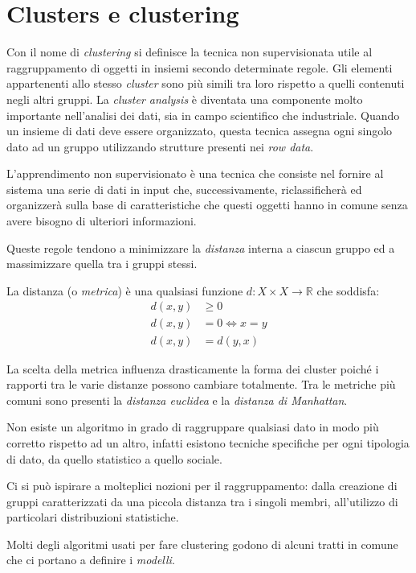 \chapter{Clusters e clustering}
	Con il nome di \emph{clustering} si definisce la tecnica non supervisionata utile al raggruppamento di oggetti in insiemi secondo determinate regole. Gli elementi appartenenti allo stesso \emph{cluster} sono più simili tra loro rispetto a quelli contenuti negli altri gruppi. La \emph{cluster analysis} è diventata una componente molto importante nell'analisi dei dati, sia in campo scientifico che industriale. Quando un insieme di dati deve essere organizzato, questa tecnica assegna ogni singolo dato ad un gruppo utilizzando strutture presenti nei \emph{row data}.

	L'apprendimento non supervisionato è una tecnica che consiste nel fornire al sistema una serie di dati in input che, successivamente, riclassificherà ed organizzerà sulla base di caratteristiche che questi oggetti hanno in comune senza avere bisogno di ulteriori informazioni.

	Queste regole tendono a minimizzare la \emph{distanza} interna a ciascun gruppo ed a massimizzare quella tra i gruppi stessi.

	La distanza (o \emph{metrica}) è una qualsiasi funzione $d:X \times X \to \mathbb{R}$ che soddisfa\cite{definizione_di_distanza}:
	\begin{align*}
		d(x,y) &\geq 0 \\
		d(x,y) &= 0 \iff x=y \\
		d(x,y) &= d(y,x)
	\end{align*}

	La scelta della metrica influenza drasticamente la forma dei cluster poiché i rapporti tra le varie distanze possono cambiare totalmente. Tra le metriche più comuni sono presenti la \emph{distanza euclidea} e la \emph{distanza di Manhattan}.

	Non esiste un algoritmo in grado di raggruppare qualsiasi dato in modo più corretto rispetto ad un altro, infatti esistono tecniche specifiche per ogni tipologia di dato, da quello statistico a quello sociale.

	Ci si può ispirare a molteplici nozioni per il raggruppamento: dalla creazione di gruppi caratterizzati da una piccola distanza tra i singoli membri, all’utilizzo di particolari distribuzioni statistiche.

	Molti degli algoritmi usati per fare clustering godono di alcuni tratti in comune che ci portano a definire i \emph{modelli}.

